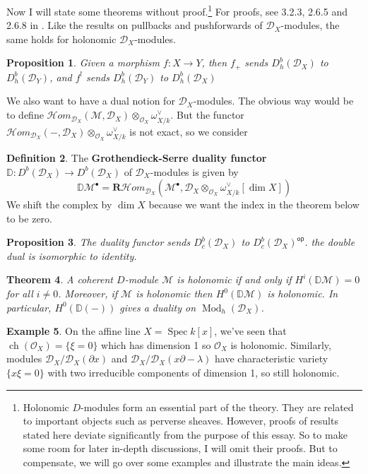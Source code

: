 \documentclass[11pt, a4paper]{article}
\newtheorem{theorem}{Theorem}[subsection]
\newtheorem{proposition}[theorem]{Proposition}
\theoremstyle{definition}
\newtheorem{example}[theorem]{Example}
\newtheorem{definition}[theorem]{Definition}
\newcommand{\w}[0]{\omega}
\newcommand{\Spec}[0]{\operatorname{Spec}}
\newcommand{\op}[0]{\mathsf{op}}
\newcommand{\Mod}{\operatorname{Mod}}
\newcommand{\dR}{\mathbf{R}}
\newcommand{\ch}{\operatorname{ch}}
\begin{document}
    Now I will state some theorems without proof.\footnote[2]{Holonomic $D$-modules form an essential part of the theory. They are related to important objects such as perverse sheaves. However, proofs of results stated here deviate significantly from the purpose of this essay. So to make some room for later in-depth discussions, I will omit their proofs. But to compensate, we will go over some examples and illustrate the main ideas.} For proofs, see 3.2.3, 2.6.5 and 2.6.8 in \cite{htt-d-modules}. Like the results on pullbacks and pushforwards of $\mathcal D_X$-modules, the same holds for holonomic $\mathcal D_X$-modules.
    \begin{proposition}
        Given a morphism $f:X\to Y$, then $f_+$ sends $D_h^b(\mathcal D_X)$ to $D_h^b(\mathcal D_Y)$, and $f^!$ sends $D_h^b(\mathcal D_Y)$ to $D_h^b(\mathcal D_X)$
    \end{proposition}
    We also want to have a dual notion for $\mathcal D_X$-modules. The obvious way would be to define $\mathcal Hom_{\mathcal D_X}(\mathcal M,\mathcal D_X)\otimes_{\mathcal O_X}\w_{X/k}^{\vee}$. But the functor $\mathcal Hom_{\mathcal D_X}(-,\mathcal D_X)\otimes_{\mathcal O_X}\w_{X/k}^{\vee}$ is not exact, so we consider 
    \begin{definition}
        The \textbf{Grothendieck-Serre duality functor} $\mathbb D:D^b(\mathcal D_X)\to D^b(\mathcal D_X)$ of $\mathcal D_X$-modules is given by
        \[\mathbb D\mathcal M^\bullet=\dR\mathcal Hom_{\mathcal D_X}(\mathcal M^\bullet,\mathcal D_X\otimes_{\mathcal O_X}\w_{X/k}^{\vee}[\dim X])\]
        We shift the complex by $\dim X$ because we want the index in the theorem below to be zero.
    \end{definition}
    \begin{proposition}
        The duality functor sends $D_c^b(\mathcal D_X)$ to $D_c^b(\mathcal D_X)^{\op}$. the double dual is isomorphic to identity.
    \end{proposition}
    \begin{theorem}\label{thm-holonomic-criterion}
        A coherent $D$-module $\mathcal M$ is holonomic if and only if $H^i(\mathbb D\mathcal M)=0$ for all $i\neq 0$. Moreover, if $\mathcal M$ is holonomic then $H^0(\mathbb D\mathcal M)$ is holonomic. In particular, $H^0(\mathbb D(-))$ gives a duality on $\Mod_h(\mathcal D_X)$.
    \end{theorem}
    \begin{example}
        On the affine line $X=\Spec k[x]$, we've seen that $\ch(\mathcal O_X)=\{\xi=0\}$ which has dimension 1 so $\mathcal O_X$ is holonomic. Similarly, modules $\mathcal D_X/\mathcal D_X(\partial x)$ and $\mathcal D_X/\mathcal D_X(x\partial-\lambda)$ have characteristic variety $\{x\xi=0\}$ with two irreducible components of dimension 1, so still holonomic.
    \end{example}
\end{document}

